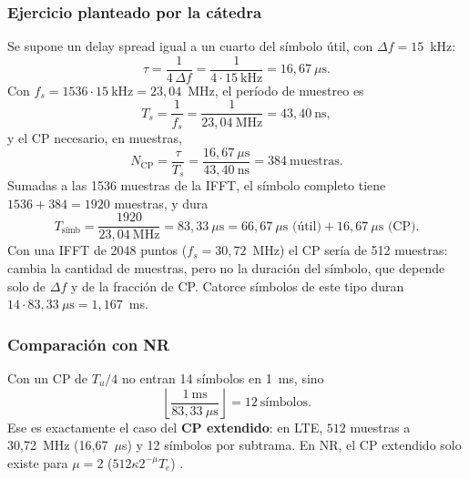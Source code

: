 \subsubsection{Ejercicio planteado por la cátedra}\label{sec:ejercicio_cp}
Se supone un delay spread igual a un cuarto del símbolo útil, con $\Delta f=15$~kHz:
\begin{equation}
\tau = \frac{1}{4\,\Delta f} = \frac{1}{4\cdot 15~\text{kHz}} = 16{,}67~\mu\text{s}.
\end{equation}
Con $f_s = 1536\cdot 15~\text{kHz} = 23{,}04$~MHz, el período de muestreo es
\begin{equation}
T_s = \frac{1}{f_s} = \frac{1}{23{,}04~\text{MHz}} = 43{,}40~\text{ns},
\end{equation}
y el CP necesario, en muestras,
\begin{equation}
N_\text{CP} = \frac{\tau}{T_s} = \frac{16{,}67~\mu\text{s}}{43{,}40~\text{ns}} = 384~\text{muestras}.
\end{equation}
Sumadas a las 1536 muestras de la IFFT, el símbolo completo tiene $1536+384 = 1920$ muestras, y dura
\begin{equation}
T_\text{símb} = \frac{1920}{23{,}04~\text{MHz}} = 83{,}33~\mu\text{s} = 66{,}67~\mu\text{s (útil)} + 16{,}67~\mu\text{s (CP)}.
\end{equation}
Con una IFFT de 2048 puntos ($f_s = 30{,}72$~MHz) el CP sería de 512 muestras: cambia la cantidad de muestras, pero no la duración del símbolo, que depende solo de $\Delta f$ y de la fracción de CP. Catorce símbolos de este tipo duran $14\cdot 83{,}33~\mu\text{s} = 1{,}167$~ms.

\subsubsection{Comparación con NR}
Con un CP de $T_u/4$ no entran 14 símbolos en 1~ms, sino
\begin{equation}
\left\lfloor \frac{1~\text{ms}}{83{,}33~\mu\text{s}} \right\rfloor = 12~\text{símbolos}.
\end{equation}
Ese es exactamente el caso del \textbf{CP extendido}: en LTE, $512$ muestras a 30,72~MHz (16,67~$\mu$s) y 12 símbolos por subtrama. En NR, el CP extendido solo existe para $\mu=2$ ($512\kappa 2^{-\mu}T_c$) \cite[§5.3.1]{ts38211}.

